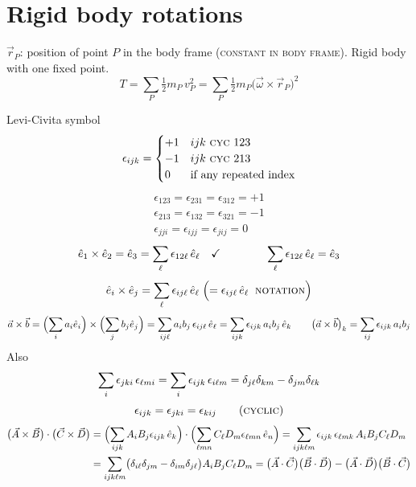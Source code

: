 \documentclass[11pt]{article}
\newcommand{\ehat}[1]{\hat{e}_{#1}}
\begin{document}
\section*{Rigid body rotations}

$\vec{r}_P$: position of point $P$ in the body frame (\textsc{constant in body frame}).
Rigid body with one fixed point.
\begin{equation*}
T = \sum_P \tfrac{1}{2} m_P\, v_P^{2} = \sum_P \tfrac{1}{2} m_P \bigl(\vec{\omega}\times\vec{r}_P\bigr)^{2}
\end{equation*}

Levi-Civita symbol
\begin{equation*}
\epsilon_{ijk} =
\begin{cases}
+1 & ijk \text{ \textsc{cyc} } 123\\
-1 & ijk \text{ \textsc{cyc} } 213\\
0 & \text{if any repeated index}
\end{cases}
\end{equation*}
\begin{gather*}
\epsilon_{123} = \epsilon_{231} = \epsilon_{312} = +1\\
\epsilon_{213} = \epsilon_{132} = \epsilon_{321} = -1\\
\epsilon_{jji} = \epsilon_{ijj} = \epsilon_{jij} = 0
\end{gather*}
\begin{gather*}
\ehat{1}\times\ehat{2} = \ehat{3} = \sum_{\ell}\epsilon_{12\ell}\,\ehat{\ell}\quad\checkmark
\qquad\qquad
\sum_{\ell}\epsilon_{12\ell}\,\ehat{\ell} = \ehat{3}\\[4pt]
\ehat{i}\times\ehat{j} = \sum_{\ell}\epsilon_{ij\ell}\,\ehat{\ell}
\;\Bigl(= \epsilon_{ij\ell}\,\ehat{\ell}\;\;\text{\textsc{notation}}\Bigr)
\end{gather*}
\begin{gather*}
\vec{a}\times\vec{b} = \Bigl(\sum_i a_i\ehat{i}\Bigr)\times\Bigl(\sum_j b_j\ehat{j}\Bigr)
= \sum_{ij\ell} a_i b_j\,\epsilon_{ij\ell}\,\ehat{\ell}
= \sum_{ijk} \epsilon_{ijk}\, a_i b_j\,\ehat{k}
\qquad
\bigl(\vec{a}\times\vec{b}\bigr)_k = \sum_{ij}\epsilon_{ijk}\,a_i b_j
\end{gather*}
Also
\begin{gather*}
\sum_i \epsilon_{jki}\,\epsilon_{\ell m i} = \sum_i \epsilon_{ijk}\,\epsilon_{i\ell m}
= \delta_{j\ell}\delta_{km} - \delta_{jm}\delta_{\ell k}\\[2pt]
\epsilon_{ijk} = \epsilon_{jki} = \epsilon_{kij} \qquad (\textsc{cyclic})
\end{gather*}
\begin{align*}
\bigl(\vec{A}\times\vec{B}\bigr)\cdot\bigl(\vec{C}\times\vec{D}\bigr)
&= \Bigl(\sum_{ijk} A_i B_j \epsilon_{ijk}\,\ehat{k}\Bigr)\cdot
\Bigl(\sum_{\ell m n} C_\ell D_m \epsilon_{\ell m n}\,\ehat{n}\Bigr)
= \sum_{ijk\ell m}\epsilon_{ijk}\,\epsilon_{\ell m k}\,A_i B_j C_\ell D_m\\
&= \sum_{ijk\ell m}\bigl(\delta_{i\ell}\delta_{jm}-\delta_{im}\delta_{j\ell}\bigr) A_i B_j C_\ell D_m
= \bigl(\vec{A}\cdot\vec{C}\bigr)\bigl(\vec{B}\cdot\vec{D}\bigr)
- \bigl(\vec{A}\cdot\vec{D}\bigr)\bigl(\vec{B}\cdot\vec{C}\bigr)
\end{align*}
\end{document}
